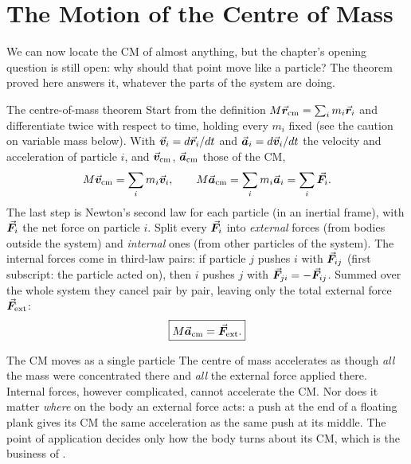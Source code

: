 \begin{figure}[htbp]
\centering
{}
\end{figure}

\section{The Motion of the Centre of Mass}

We can now locate the CM of almost anything, but the chapter's opening question is still open: why should
that point move like a particle? The theorem proved here answers it, whatever the parts of the system are doing.

\begin{derivbox}{The centre-of-mass theorem}
Start from the definition $M\vec{\bm{r}}_{\text{cm}}=\sum_i m_i\vec{\bm{r}}_i$ and differentiate twice with respect to
time, holding every $m_i$ fixed (see the caution on variable mass below). With $\vec{\bm{v}}_i=d\vec{\bm{r}}_i/dt$ and
$\vec{\bm{a}}_i=d\vec{\bm{v}}_i/dt$ the velocity and acceleration of particle $i$, and $\vec{\bm{v}}_{\text{cm}}$, $\vec{\bm{a}}_{\text{cm}}$
those of the CM,
\[
M\vec{\bm{v}}_{\text{cm}}=\sum_i m_i\vec{\bm{v}}_i,\qquad M\vec{\bm{a}}_{\text{cm}}=\sum_i m_i\vec{\bm{a}}_i=\sum_i \vec{\bm{F}}_i.
\]
The last step is Newton's second law for each particle (in an inertial frame), with $\vec{\bm{F}}_i$ the net force
on particle $i$. Split every $\vec{\bm{F}}_i$ into \emph{external} forces (from bodies outside the system) and
\emph{internal} ones (from other particles of the system). The internal forces come in third-law pairs: if
particle $j$ pushes $i$ with $\vec{\bm{F}}_{ij}$ (first subscript: the particle acted on), then $i$ pushes $j$ with
$\vec{\bm{F}}_{ji}=-\vec{\bm{F}}_{ij}$. Summed over the whole system they
cancel pair by pair, leaving only the total external force $\vec{\bm{F}}_{\text{ext}}$:
\[
\boxed{M\vec{\bm{a}}_{\text{cm}}=\vec{\bm{F}}_{\text{ext}}.}
\]
\end{derivbox}

\begin{keybox}{The CM moves as a single particle}
The centre of mass accelerates as though \emph{all} the mass were concentrated there and \emph{all} the
external force applied there. Internal forces, however complicated, cannot accelerate the CM. Nor does it
matter \emph{where} on the body an external force acts: a push at the end of a floating plank gives its CM
the same acceleration as the same push at its middle. The point of application decides only how the body
turns about its CM, which is the business of .
\end{keybox}

